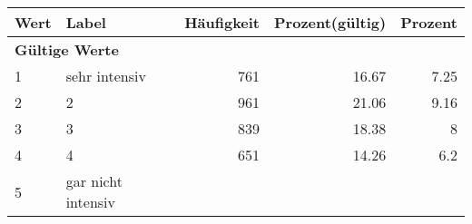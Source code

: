     \begin{longtable}{lXrrr}
     \toprule
     \textbf{Wert} & \textbf{Label} & \textbf{Häufigkeit} & \textbf{Prozent(gültig)} & \textbf{Prozent} \\
     \endhead
     \midrule
     \multicolumn{5}{l}{\textbf{Gültige Werte}}\\

     1 &
     \multicolumn{1}{X}{ sehr intensiv   } &


       \num{761} &
       \num[round-mode=places,round-precision=2]{16.67} &
         \num[round-mode=places,round-precision=2]{7.25} \\

     2 &
     \multicolumn{1}{X}{ 2   } &


       \num{961} &
       \num[round-mode=places,round-precision=2]{21.06} &
         \num[round-mode=places,round-precision=2]{9.16} \\

     3 &
     \multicolumn{1}{X}{ 3   } &


       \num{839} &
       \num[round-mode=places,round-precision=2]{18.38} &
         \num[round-mode=places,round-precision=2]{8} \\

     4 &
     \multicolumn{1}{X}{ 4   } &


       \num{651} &
       \num[round-mode=places,round-precision=2]{14.26} &
         \num[round-mode=places,round-precision=2]{6.2} \\

     5 &
     \multicolumn{1}{X}{ gar nicht intensiv   } &



\end{longtable}
